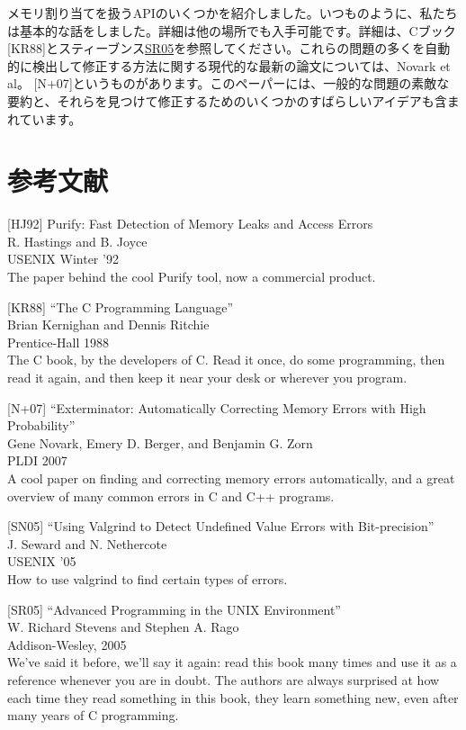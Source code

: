 メモリ割り当てを扱うAPIのいくつかを紹介しました。いつものように、私たちは基本的な話をしました。詳細は他の場所でも入手可能です。詳細は、Cブック{[}KR88{]}とスティーブンス\href{第7章}{SR05}を参照してください。これらの問題の多くを自動的に検出して修正する方法に関する現代的な最新の論文については、Novark
et al。
{[}N+07{]}というものがあります。このペーパーには、一般的な問題の素敵な要約と、それらを見つけて修正するためのいくつかのすばらしいアイデアも含まれています。

\hypertarget{ux53c2ux8003ux6587ux732e-6}{%
\section*{参考文献}\label{ux53c2ux8003ux6587ux732e-6}}

{[}HJ92{]} Purify: Fast Detection of Memory Leaks and Access Errors\\
R. Hastings and B. Joyce\\
USENIX Winter '92\\
The paper behind the cool Purify tool, now a commercial product.

{[}KR88{]} ``The C Programming Language''\\
Brian Kernighan and Dennis Ritchie\\
Prentice-Hall 1988\\
The C book, by the developers of C. Read it once, do some programming,
then read it again, and then keep it near your desk or wherever you
program.

{[}N+07{]} ``Exterminator: Automatically Correcting Memory Errors with
High Probability''\\
Gene Novark, Emery D. Berger, and Benjamin G. Zorn\\
PLDI 2007\\
A cool paper on finding and correcting memory errors automatically, and
a great overview of many common errors in C and C++ programs.

{[}SN05{]} ``Using Valgrind to Detect Undefined Value Errors with
Bit-precision''\\
J. Seward and N. Nethercote\\
USENIX '05\\
How to use valgrind to find certain types of errors.

{[}SR05{]} ``Advanced Programming in the UNIX Environment''\\
W. Richard Stevens and Stephen A. Rago\\
Addison-Wesley, 2005\\
We've said it before, we'll say it again: read this book many times and
use it as a reference whenever you are in doubt. The authors are always
surprised at how each time they read something in this book, they learn
something new, even after many years of C programming.

